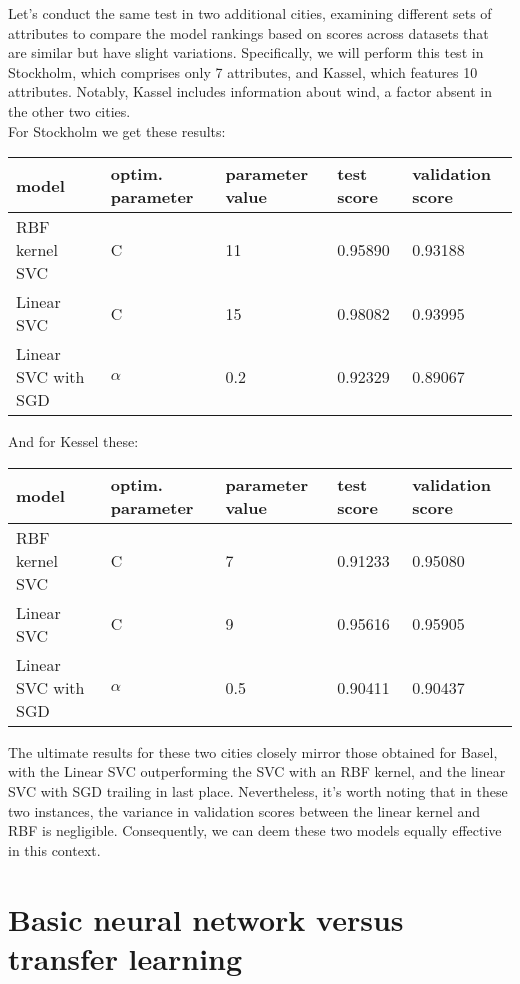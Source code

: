 \documentclass[a4paper]{article}
\begin{document}
	Let's conduct the same test in two additional cities, examining different sets of attributes to compare the model rankings based on scores across datasets that are similar but have slight variations. Specifically, we will perform this test in Stockholm, which comprises only 7 attributes, and Kassel, which features 10 attributes. Notably, Kassel includes information about wind, a factor absent in the other two cities.
	\\
	
	For Stockholm we get these results:
	\begin{table}[!h]
		\begin{tabular}{|l|l|l|l|l|}
			\hline
			model & optim. parameter & parameter value & test score & validation score \\ \hline
			RBF kernel SVC & C & 11 & 0.95890 & 0.93188 \\ \hline
			Linear SVC & C & 15 & 0.98082 & 0.93995 \\ \hline
			Linear SVC with SGD& $\alpha$ & 0.2 & 0.92329 & 0.89067 \\ \hline
		\end{tabular}
	\end{table} 

	And for Kessel these:
	\begin{table}[!h]
		\begin{tabular}{|l|l|l|l|l|}
			\hline
			model & optim. parameter & parameter value & test score & validation score \\ \hline
			RBF kernel SVC & C & 7 & 0.91233 & 0.95080 \\ \hline
			Linear SVC & C & 9 & 0.95616 & 0.95905 \\ \hline
			Linear SVC with SGD& $\alpha$ & 0.5 & 0.90411 & 0.90437 \\ \hline
		\end{tabular}
	\end{table} 
	 
	The ultimate results for these two cities closely mirror those obtained for Basel, with the Linear SVC outperforming the SVC with an RBF kernel, and the linear SVC with SGD trailing in last place. Nevertheless, it's worth noting that in these two instances, the variance in validation scores between the linear kernel and RBF is negligible. Consequently, we can deem these two models equally effective in this context.
	
	\newpage

	\section{Basic neural network versus transfer learning}
	
\end{document}

